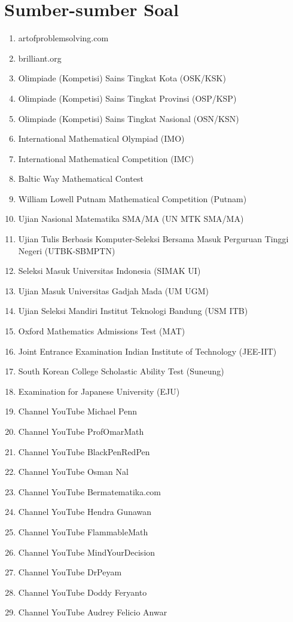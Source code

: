 \chapter{Sumber-sumber Soal}

\begin{enumerate}[leftmargin=*]
	\item artofproblemsolving.com
	\item brilliant.org
	\item Olimpiade (Kompetisi) Sains Tingkat Kota (OSK/KSK)
	\item Olimpiade (Kompetisi) Sains Tingkat Provinsi (OSP/KSP)
	\item Olimpiade (Kompetisi) Sains Tingkat Nasional (OSN/KSN)
	\item International Mathematical Olympiad (IMO)
	\item International Mathematical Competition (IMC)
	\item Baltic Way Mathematical Contest
	\item William Lowell Putnam Mathematical Competition (Putnam)
	\item Ujian Nasional Matematika SMA/MA (UN MTK SMA/MA)
	\item Ujian Tulis Berbasis Komputer-Seleksi Bersama Masuk Perguruan Tinggi Negeri (UTBK-SBMPTN)
	\item Seleksi Masuk Universitas Indonesia (SIMAK UI)
	\item Ujian Masuk Universitas Gadjah Mada (UM UGM)
	\item Ujian Seleksi Mandiri Institut Teknologi Bandung (USM ITB)
	\item Oxford Mathematics Admissions Test (MAT)
	\item Joint Entrance Examination Indian Institute of Technology (JEE-IIT)
	\item South Korean College Scholastic Ability Test (Suneung)
	\item Examination for Japanese University (EJU)
	\item Channel YouTube Michael Penn
	\item Channel YouTube ProfOmarMath
	\item Channel YouTube BlackPenRedPen
	\item Channel YouTube Osman Nal
	\item Channel YouTube Bermatematika.com
	\item Channel YouTube Hendra Gunawan
	\item Channel YouTube FlammableMath
	\item Channel YouTube MindYourDecision
	\item Channel YouTube DrPeyam
	\item Channel YouTube Doddy Feryanto
	\item Channel YouTube Audrey Felicio Anwar
\end{enumerate}